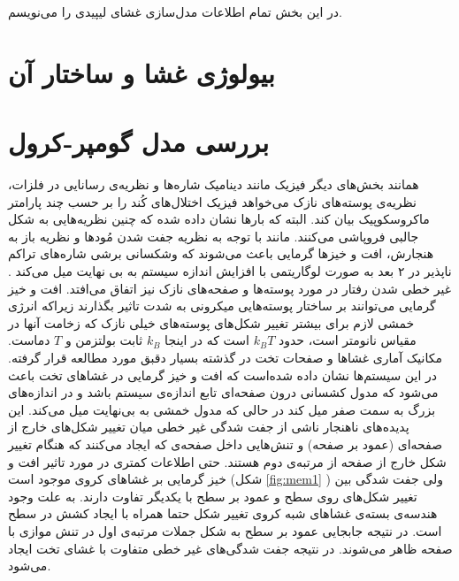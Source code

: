 \setRL
\clearpage
{} 



در این بخش تمام اطلاعات مدل‌سازی غشای لیپیدی را می‌نویسم.


\section{
بیولوژی غشا و ساختار آن
}
















\section{
بررسی مدل گومپر-کرول
}
همانند بخش‌های دیگر فیزیک مانند دینامیک شاره‌ها و نظریه‌ی رسانایی در فلزات، نظریه‌ی پوسته‌های نازک می‌خواهد فیزیک اختلال‌های کُند را بر حسب چند پارامتر ماکروسکوپیک بیان کند. البته که بارها نشان داده شده که چنین نظریه‌هایی به شکل‌ جالبی فروپاشی می‌کنند. مانند با توجه به نظریه جفت شدن مُود‌ها و نظریه باز به هنجارش، افت و خیز‌ها گرمایی باعث می‌شوند که وشکسانی برشی
شاره‌های تراکم ناپذیر در ۲ بعد به صورت لوگاریتمی با افزایش اندازه سیستم به بی نهایت میل می‌کند 
\cite{gomppernelson2012}
. غیر خطی شدن رفتار در مورد پوسته‌ها و صفحه‌های نازک نیز اتفاق می‌افتد. افت و خیز گرمایی می‌توانند بر ساختار پوسته‌هایی میکرونی به شدت تاثیر بگذارند زیراکه انرژی خمشی لازم برای بیشتر تغییر شکل‌های پوسته‌های خیلی نازک که زخامت آنها در مقیاس نانومتر است، حدود $k_BT$ است که در اینجا $k_B$ ثابت بولتزمن و
$T$
دماست. مکانیک آماری غشاها و صفحات تخت در گذشته بسیار دقبق مورد مطالعه قرار گرفته. در این سیستم‌ها نشان داده شده‌است که افت و خیز گرمایی در غشاهای تخت باعث می‌شود که مدول کشسانی درون صفحه‌ای
 تابع اندازه‌‌ی سیستم باشد و در اندازه‌های بزرگ به سمت صفر میل کند در حالی که مدول خمشی به بی‌نهایت میل می‌کند. این پدیده‌های ناهنجار ناشی از جفت شدگی غیر خطی میان تغییر شکل‌های خارج از صفحه‌ای (عمود بر صفحه) و تنش‌هایی داخل صفحه‌ی که ایجاد می‌کنند که هنگام تغییر شکل خارج از صفحه از مرتبه‌ی دوم هستند. حتی اطلاعات کمتری در مورد تاثیر افت و خیز گرمایی بر غشا‌های کروی موجود است (شکل 
 \ref{fig:mem1}
)
ولی جفت شدگی بین تغییر شکل‌های روی سطح و عمود بر سطح با یکدیگر تفاوت دارند. به علت وجود هندسه‌ی بسته‌ی غشاهای شبه کروی تغییر شکل حتما همراه با ایجاد کشش در سطح است. در نتیجه جابجایی عمود بر سطح به شکل جملات مرتبه‌ی اول در تنش موازی با صفحه ظاهر می‌شوند. در نتیجه جفت‌ شدگی‌های غیر خطی متفاوت با غشای تخت ایجاد می‌‌شود.


